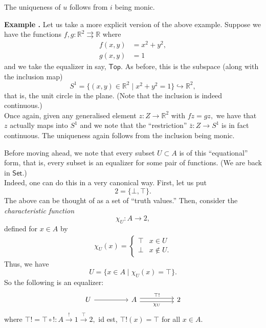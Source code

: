 \documentclass[11pt,leqno,landscape,semhelv]{seminar}
\theoremstyle{definition}
\numberwithin{joke}{section}
\numberwithin{thm}{section}
\numberwithin{equation}{section}
\newcommand{\example}[1]{\refstepcounter{thm}\par\medskip
   {\textbf{Example \thethm.} #1} \rmfamily}
\newcommand{\tto}{\rightrightarrows}
\begin{document}
The uniqueness of $u$ follows from $i$ being monic.

\example{} Let us take a more explicit version of the above example. Suppose we have the functions $f, g: \mathbb{R}^2 \tto \mathbb{R}$ where
\begin{align*} 
  f(x, y) &= x^2 + y^2,\\
  g(x, y) &= 1
\end{align*}
and we take the equalizer in say, $\mathsf{Top}.$ As before, this is the subspace (along with the inclusion map)
\begin{equation*} 
  S^1 = \{(x, y) \in \mathbb{R}^2 \mid x^2 + y^2 = 1\} \hookrightarrow \mathbb{R}^2,
\end{equation*}
that is, the unit circle in the plane. (Note that the inclusion is indeed continuous.)\\
Once again, given any generalised element $z:Z\to \mathbb{R}^2$ with $fz = gz,$ we have that $z$ actually maps into $S^1$ and we note that the ``restriction'' $\bar{z}:Z\to S^1$ is in fact continuous. The uniqueness again follows from the inclusion being monic.

Before moving ahead, we note that every subset $U \subset A$ is of this ``equational'' form, that is, every subset is an equalizer for some pair of functions. (We are back in $\mathsf{Set}.$)\\
Indeed, one can do this in a very canonical way. First, let us put 
\begin{equation*} 
  2 = \{\bot, \top\}.
\end{equation*}
The above can be thought of as a set of ``truth values.'' Then, consider the \emph{characteristic function}
\begin{equation*} 
  \chi_U : A \to 2,
\end{equation*}
defined for $x \in A$ by
\begin{align*} 
  \chi_U(x) = \begin{cases}
    \top & x \in U\\
    \bot & x \notin U.
  \end{cases}
\end{align*}
Thus, we have
\begin{equation*} 
  U = \{x \in A \mid \chi_U(x) = \top\}.
\end{equation*}
So the following is an equalizer:
\begin{equation*} 
  \begin{tikzcd}
    U \arrow[rr] && A \arrow[rr, "\top!", shift left] \arrow[rr, "\chi_U"', shift right] && 2
  \end{tikzcd}
\end{equation*}
where $\top! = \top\circ !:A \overset{!}{\longrightarrow}1 \overset{\top}{\longrightarrow}2,$ id est, $\top!(x) = \top$ for all $x \in A.$
\end{document}
